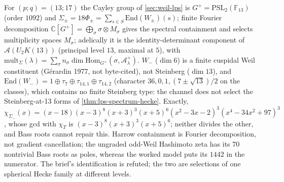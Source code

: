 \begin{theorem}
\label{thm:weil-lps-versus-square-complex}
For $(p;q) = (13;17)$ the Cayley group of \cref{sec:weil-lps} is $G^+ = \mathrm{PSL}_2(\mathbb F_{13})$ (order $1092$) and
$\Sigma_\pm = 18\Phi_\pm = \sum_{s\in S}\mathrm{End}(W_\pm)(s)$; finite Fourier decomposition $\mathbb C[G^+] = \bigoplus_\sigma\sigma\otimes M_\sigma$ gives
the spectral containment and selects multiplicity spaces $M_\sigma$; adelically it is the identity-determinant component of
$\mathcal A(U_2K(13))$ (principal level $13$, maximal at $5$), with $\mathrm{mult}_{\Sigma}(\lambda) = \sum_\sigma n_\sigma\dim\mathrm{Hom}_{G^+}(\sigma,\mathcal A^+_\lambda)$.
$W_-$ ($\dim6$) is a finite cuspidal Weil constituent (G\'erardin 1977, not byte-cited), not Steinberg ($\dim13$), and
$\mathrm{End}(W_-) = 1\oplus\tau_7\oplus\tau_{14,1}\oplus\tau_{14,2}$ (character $36,0,1,(7\pm\sqrt{13})/2$ on the classes), which contains no
finite Steinberg type: the channel does not select the Steinberg-at-13 forms of \cref{thm:lps-spectrum-hecke}. Exactly,
$\chi_{\Sigma_-}(x) = (x-18)(x-3)^8(x+3)^3(x+5)^6(x^2-3x-2)^3(x^4-34x^2+97)^3$, whose gcd with $\chi_T$ is
$(x-3)^8(x+3)^3(x+5)^6$; neither divides the other, and Bass roots cannot repair this. Harrow containment is Fourier
decomposition, not gradient cancellation; the ungraded odd-Weil Hashimoto zeta has its $70$ nontrivial Bass roots as poles,
whereas the worked model puts its $1442$ in the numerator. The brief's identification is refuted; the two are selections
of one spherical Hecke family at different levels.
\end{theorem}

